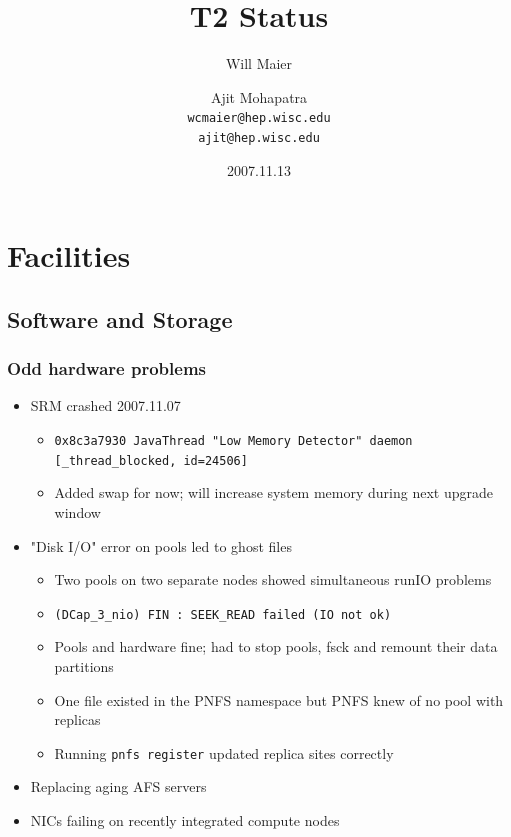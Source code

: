 \documentclass{beamer}
\title{T2 Status}
\author[Maier, Mohapatra]{
    Will Maier \and Ajit Mohapatra\\ 
    {\tt wcmaier@hep.wisc.edu}\\
    {\tt ajit@hep.wisc.edu}}
\institute[Wisconsin]{University of Wisconsin - High Energy Physics}
\date{2007.11.13}
\begin{document}
\begin{frame}
    \titlepage
\end{frame}


\section{Facilities}
\subsection{Software and Storage}
\begin{frame}
\frametitle{Odd hardware problems}
\begin{itemize}
    \item SRM crashed 2007.11.07
    \begin{itemize}
        \item {\tt 0x8c3a7930 JavaThread "Low Memory Detector" daemon [\_thread\_blocked, id=24506]}
        \item Added swap for now; will increase system memory during next upgrade window
    \end{itemize}
    \item "Disk I/O" error on pools led to ghost files
    \begin{itemize}
        \item Two pools on two separate nodes showed simultaneous runIO problems
        \item {\tt (DCap\_3\_nio) FIN : SEEK\_READ failed (IO not ok)}
        \item Pools and hardware fine; had to stop pools, fsck and remount their data partitions
        \item One file existed in the PNFS namespace but PNFS knew of no pool with replicas
        \item Running {\tt pnfs register} updated replica sites correctly
    \end{itemize}
    \item Replacing aging AFS servers
    \item NICs failing on recently integrated compute nodes
\end{itemize}
\end{frame}
\end{document}

